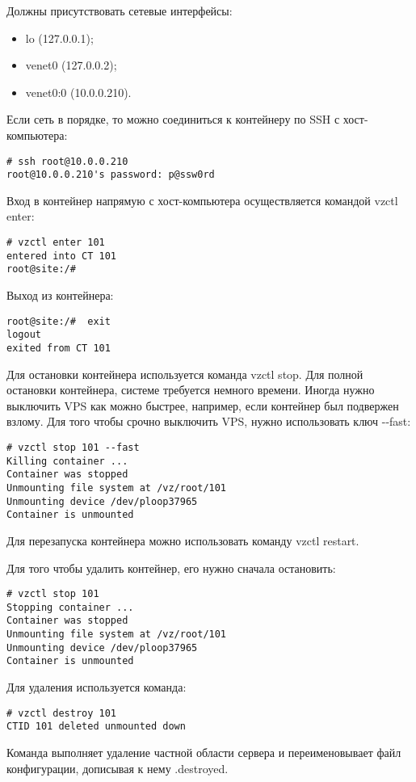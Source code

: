 Должны присутствовать сетевые интерфейсы:
\begin{itemize}
    \item lo (127.0.0.1);
    \item venet0 (127.0.0.2);
    \item venet0:0 (10.0.0.210).
\end{itemize}

Если сеть в порядке, то можно соединиться к контейнеру по SSH с хост-компьютера:
\begin{lstlisting}
# ssh root@10.0.0.210
root@10.0.0.210's password: p@ssw0rd
\end{lstlisting}

Вход в контейнер напрямую с хост-компьютера осуществляется командой vzctl enter:
\begin{lstlisting}
# vzctl enter 101
entered into CT 101
root@site:/#
\end{lstlisting}

Выход из контейнера:
\begin{lstlisting}
root@site:/#  exit
logout
exited from CT 101
\end{lstlisting}

Для остановки контейнера используется команда vzctl stop.
Для полной остановки контейнера, системе требуется немного времени.
Иногда нужно выключить VPS как можно быстрее, например, если контейнер был подвержен взлому.
Для того чтобы срочно выключить VPS, нужно использовать ключ -{}-fast:
\begin{lstlisting}
# vzctl stop 101 --fast
Killing container ...
Container was stopped
Unmounting file system at /vz/root/101
Unmounting device /dev/ploop37965
Container is unmounted
\end{lstlisting}

Для перезапуска контейнера можно использовать команду vzctl restart.

Для того чтобы удалить контейнер, его нужно сначала остановить:
\begin{lstlisting}
# vzctl stop 101
Stopping container ...
Container was stopped
Unmounting file system at /vz/root/101
Unmounting device /dev/ploop37965
Container is unmounted
\end{lstlisting}

Для удаления используется команда:
\begin{lstlisting}
# vzctl destroy 101
CTID 101 deleted unmounted down
\end{lstlisting}

Команда выполняет удаление частной области сервера и переименовывает файл конфигурации, дописывая к нему .destroyed.

